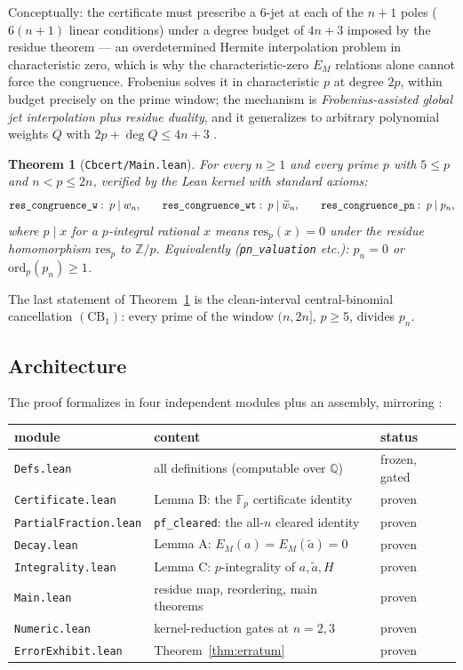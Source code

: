 \documentclass[11pt]{article}
\newtheorem{theorem}{Theorem}
\theoremstyle{definition}
\newcommand{\Fp}{\mathbb{F}_p}
\newcommand{\Z}{\mathbb{Z}}
\newcommand{\Q}{\mathbb{Q}}
\newcommand{\wtd}{\widetilde}
\newcommand{\lean}[1]{\texttt{#1}}
\begin{document}
Conceptually: the certificate must prescribe a $6$-jet at each of the $n+1$
poles ($6(n+1)$ linear conditions) under a degree budget of $4n+3$ imposed by
the residue theorem --- an overdetermined Hermite interpolation problem in
characteristic zero, which is why the characteristic-zero $E_M$ relations
alone cannot force the congruence. Frobenius solves it in characteristic $p$
at degree $2p$, within budget precisely on the prime window; the mechanism is
\emph{Frobenius-assisted global jet interpolation plus residue duality}, and
it generalizes to arbitrary polynomial weights $Q$ with
$2p + \deg Q \le 4n+3$ \cite{CBcert}.

\begin{theorem}[{\lean{Cbcert/Main.lean}}]\label{thm:cert}
For every $n \ge 1$ and every prime $p$ with $5 \le p$ and $n < p \le 2n$,
verified by the Lean kernel with standard axioms:
\[
\text{\lean{res\_congruence\_w}}:\; p \mid w_n, \qquad
\text{\lean{res\_congruence\_wt}}:\; p \mid \wtd w_n, \qquad
\text{\lean{res\_congruence\_pn}}:\; p \mid p_n,
\]
where $p \mid x$ for a $p$-integral rational $x$ means $\mathrm{res}_p(x) =
0$ under the residue homomorphism $\mathrm{res}_p$ to $\Z/p$. Equivalently
\textup{(}\lean{pn\_valuation} etc.\textup{)}: $p_n = 0$ or
$\mathrm{ord}_p(p_n) \ge 1$.
\end{theorem}

The last statement of Theorem~\ref{thm:cert} is the clean-interval
central-binomial cancellation $(\mathrm{CB}_1)$: every prime of the window
$(n, 2n]$, $p \ge 5$, divides $p_n$.

\subsection*{Architecture}

The proof formalizes in four independent modules plus an assembly, mirroring
\cite{CBcert}:

\begin{center}
\begin{tabular}{lll}
module & content & status \\
\hline
\lean{Defs.lean} & all definitions (computable over $\Q$) & frozen, gated \\
\lean{Certificate.lean} & Lemma B: the $\Fp$ certificate identity & proven \\
\lean{PartialFraction.lean} & \lean{pf\_cleared}: the all-$n$ cleared identity & proven \\
\lean{Decay.lean} & Lemma A: $E_M(a) = E_M(\wtd a) = 0$ & proven \\
\lean{Integrality.lean} & Lemma C: $p$-integrality of $a, \wtd a, H$ & proven \\
\lean{Main.lean} & residue map, reordering, main theorems & proven \\
\lean{Numeric.lean} & kernel-reduction gates at $n = 2, 3$ & proven \\
\lean{ErrorExhibit.lean} & Theorem~\ref{thm:erratum} & proven \\
\end{tabular}
\end{center}
\end{document}
